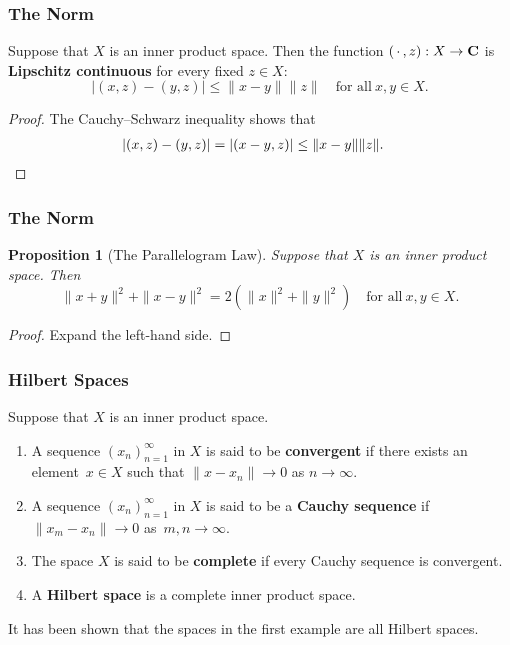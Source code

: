 \documentclass[handout]{beamer}
\makeatletter
\newtheorem{proposition}{Proposition}
\theoremstyle{remark}
\newcommand{\C}{{\bf C}}
\newcommand{\enumabc}
	{\expandafter\def\csname the\@enumctr \endcsname{\alph{\@enumctr}}%
	 \expandafter\def\csname label\@enumctr \endcsname
		{\rm(\csname the\@enumctr \endcsname)}}%
\makeatother
\begin{document}
\begin{frame}\frametitle{The Norm}

\begin{corollary}
Suppose that $X$ is an inner product space. Then the function\/ $(\,\cdot\,,z):X\rightarrow\C$ is
{\bf Lipschitz continuous} for every fixed $z\in X$\/{\rm:}
$$|(x,z)-(y,z)|\le\|x-y\|\|z\|\quad\mbox{for all}\ x,y\in X.$$
\end{corollary}

\begin{proof}
The Cauchy--Schwarz inequality shows that
\begin{align*}
|(x,z)-(y,z)|&=|(x-y,z)|\le\|x-y\|\|z\|.\qedhere
\end{align*}
\end{proof}

\end{frame}

\begin{frame}\frametitle{The Norm}

\begin{proposition}[The Parallelogram Law]
Suppose that $X$ is an inner product space. Then
$$\|x+y\|^2+\|x-y\|^2=2(\|x\|^2+\|y\|^2)\quad\mbox{for all}\ x,y\in X.$$
\end{proposition}

\begin{proof}
Expand the left-hand side.
\end{proof}

\end{frame}

\begin{frame}\frametitle{Hilbert Spaces}

\begin{definition}
Suppose that $X$ is an inner product space.
\begin{enumerate}\enumabc
\item A sequence $(x_n)^\infty_{n=1}$ in $X$ is said to be {\bf convergent} if there exists an
element~$x\in X$ such that $\|x-x_n\|\rightarrow0$ as $n\rightarrow\infty$.
\item A sequence $(x_n)^\infty_{n=1}$ in $X$ is said to be a {\bf Cauchy sequence} if
$\|x_m-x_n\|\rightarrow0$ as~$m,n\rightarrow\infty$.
\item The space $X$ is said to be {\bf complete} if every Cauchy sequence is convergent.
\item A {\bf Hilbert space} is a complete inner product space.
\end{enumerate}
\end{definition}

\begin{example}
It has been shown that the spaces in the first example are all Hilbert spaces.
\end{example}

\end{frame}
\end{document}
